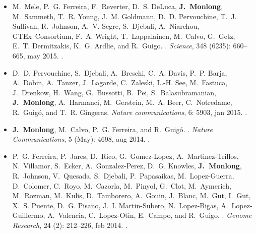 \begin{itemize}
\item M.~Mele, P.~G. Ferreira, F.~Reverter, D.~S. DeLuca, {\bf J.~Monlong}, M.~Sammeth,
  T.~R. Young, J.~M. Goldmann, D.~D. Pervouchine, T.~J. Sullivan, R.~Johnson,
  A.~V. Segre, S.~Djebali, A.~Niarchou, GTEx~Consortium, F.~A. Wright,
  T.~Lappalainen, M.~Calvo, G.~Getz, E.~T. Dermitzakis, K.~G. Ardlie, and
  R.~Guigo.
.
\newblock \emph{Science}, 348 (6235): 660--665, may 2015.
\newblock {}.

\item D.~D. Pervouchine, S.~Djebali, A.~Breschi, C.~A. Davis, P.~P. Barja, A.~Dobin,
  A.~Tanzer, J.~Lagarde, C.~Zaleski, L.-H. See, M.~Fastuca, J.~Drenkow,
  H.~Wang, G.~Bussotti, B.~Pei, S.~Balasubramanian, {\bf J.~Monlong}, A.~Harmanci,
  M.~Gerstein, M.~A. Beer, C.~Notredame, R.~Guig{\'{o}}, and T.~R. Gingeras.
\newblock \emph{Nature communications}, 6: 5903, jan
  2015{}.
\newblock {}.

\item {\bf J.~Monlong}, M.~Calvo, P.~G. Ferreira, and R.~Guig{\'{o}}.
.
\newblock \emph{Nature Communications}, 5 (May): 4698, aug
  2014.
\newblock {}.

\item P.~G. Ferreira, P.~Jares, D.~Rico, G.~Gomez-Lopez, A.~Martinez-Trillos,
  N.~Villamor, S.~Ecker, A.~Gonzalez-Perez, D.~G. Knowles, {\bf J.~Monlong},
  R.~Johnson, V.~Quesada, S.~Djebali, P.~Papasaikas, M.~Lopez-Guerra,
  D.~Colomer, C.~Royo, M.~Cazorla, M.~Pinyol, G.~Clot, M.~Aymerich, M.~Rozman,
  M.~Kulis, D.~Tamborero, A.~Gouin, J.~Blanc, M.~Gut, I.~Gut, X.~S. Puente,
  D.~G. Pisano, J.~I. Martin-Subero, N.~Lopez-Bigas, A.~Lopez-Guillermo,
  A.~Valencia, C.~Lopez-Otin, E.~Campo, and R.~Guigo.
.
\newblock \emph{Genome Research}, 24 (2): 212--226, feb 2014.
\newblock {}.


\end{itemize}
